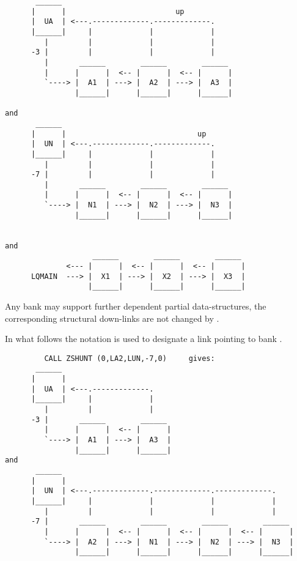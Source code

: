 \begin{verbatim}
       ______
      |      |                         up
      |  UA  | <---.-------------.-------------.
      |______|     |             |             |
         |         |             |             |
      -3 |         |             |             |
         |       ______        ______        ______
         |      |      |  <-- |      |  <-- |      |
         `----> |  A1  | ---> |  A2  | ---> |  A3  |
                |______|      |______|      |______|

and
       ______
      |      |                              up
      |  UN  | <---.-------------.-------------.
      |______|     |             |             |
         |         |             |             |
      -7 |         |             |             |
         |       ______        ______        ______
         |      |      |  <-- |      |  <-- |      |
         `----> |  N1  | ---> |  N2  | ---> |  N3  |
                |______|      |______|      |______|


and
                    ______        ______        ______
              <--- |      |  <-- |      |  <-- |      |
      LQMAIN  ---> |  X1  | ---> |  X2  | ---> |  X3  |
                   |______|      |______|      |______|
\end{verbatim} 
Any bank may support further dependent partial data-structures,
the corresponding structural down-links are not changed
by .

In what follows the notation    is used to designate
a link pointing to bank .

\Examples

\begin{verbatim}
         CALL ZSHUNT (0,LA2,LUN,-7,0)     gives:
       ______
      |      |
      |  UA  | <---.-------------.
      |______|     |             |
         |         |             |
      -3 |       ______        ______
         |      |      |  <-- |      |
         `----> |  A1  | ---> |  A3  |
                |______|      |______|
and
       ______
      |      |
      |  UN  | <---.-------------.-------------.-------------.
      |______|     |             |             |             |
         |         |             |             |             |
      -7 |       ______        ______        ______        ______
         |      |      |  <-- |      |  <-- |      |  <-- |      |
         `----> |  A2  | ---> |  N1  | ---> |  N2  | ---> |  N3  |
                |______|      |______|      |______|      |______|
\end{verbatim} 

